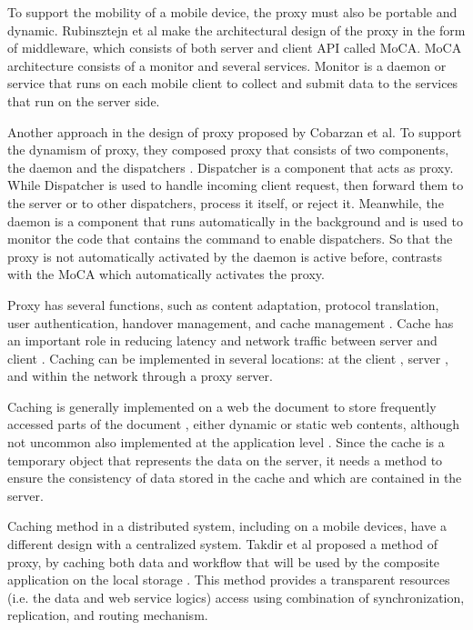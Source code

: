 \documentclass[conference]{IEEEtran}
\begin{document}
To support the mobility of a mobile device, the proxy must also be portable and dynamic. Rubinsztejn et al make the architectural design of the proxy in the form of middleware, which consists of both server and client API \cite{rubinsztejn_framework_2005} called MoCA. MoCA architecture consists of a monitor and several services. Monitor is a daemon or service that runs on each mobile client to collect and submit data to the services that run on the server side.

Another approach in the design of proxy proposed by Cobarzan et al. To support the dynamism of proxy, they composed proxy that consists of two components, the daemon and the dispatchers \cite{cobarzan_dynamic_2005}. Dispatcher is a component that acts as proxy. While Dispatcher is used to handle incoming client request, then forward them to the server or to other dispatchers, process it itself, or reject it. Meanwhile, the daemon is a component that runs automatically in the background and is used to monitor the code that contains the command to enable dispatchers. So that the proxy is not automatically activated by the daemon is active before, contrasts with the MoCA which automatically activates the proxy.

Proxy has several functions, such as content adaptation, protocol translation, user authentication, handover management, and cache management \cite{rubinsztejn_framework_2005}. Cache has an important role in reducing latency and network traffic between server and client \cite{rizzo_replacement_2000}. Caching can be implemented in several locations: at the client \cite{bestavros_application-level_1995} \cite{cao_cost-aware_1997}, server \cite{arlitt_trace-driven_1997} \cite{bestavros_application-level_1995}, and within the network \cite{abrams_caching_1995} \cite{cao_cost-aware_1997} \cite{busari_sensitivity_2001} through a proxy server.

Caching is generally implemented on a web the document to store frequently accessed parts of the document \cite{mahanti_temporal_2000} \cite{shim_proxy_1999-1} \cite{busari_sensitivity_2001}, either dynamic or static web contents, although not uncommon also implemented at the application level \cite{holder_system_1999} \cite{philippsen_javaparty_1997} \cite{rubinsztejn_framework_2005}. Since the cache is a temporary object \cite{davison_survey_1999} that represents the data on the server, it needs a method to ensure the consistency of data stored in the cache and which are contained in the server.

Caching method in a distributed system, including on a mobile devices, have a different design with a centralized system. Takdir et al proposed a method of proxy, by caching both data and workflow that will be used by the composite application on the local storage \cite{takdir_multi-layer_2014}. This method provides a transparent resources (i.e. the data and web service logics) access using combination of synchronization, replication, and routing mechanism.
\end{document}
